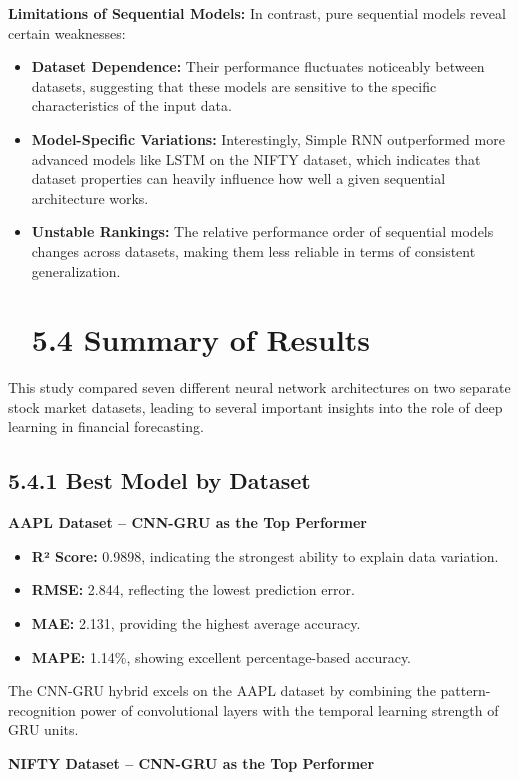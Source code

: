 \documentclass[12pt,a4paper]{report}
\begin{document}
\textbf{Limitations of Sequential Models: }In contrast, pure sequential models reveal certain weaknesses:

\begin{itemize}
  \item \textbf{Dataset Dependence:} Their performance fluctuates noticeably between datasets, suggesting that these models are sensitive to the specific characteristics of the input data.
  \item \textbf{Model-Specific Variations:} Interestingly, Simple RNN outperformed more advanced models like LSTM on the NIFTY dataset, which indicates that dataset properties can heavily influence how well a given sequential architecture works.
  \item \textbf{Unstable Rankings:} The relative performance order of sequential models changes across datasets, making them less reliable in terms of consistent generalization.
\section{5.4 Summary of Results}
\end{itemize}

This study compared seven different neural network architectures on two separate stock market datasets, leading to several important insights into the role of deep learning in financial forecasting.

\subsection{5.4.1 Best Model by Dataset}
\textbf{AAPL Dataset – CNN-GRU as the Top Performer}

\begin{itemize}
  \item \textbf{R² Score:} 0.9898, indicating the strongest ability to explain data variation.
  \item \textbf{RMSE:} 2.844, reflecting the lowest prediction error.
  \item \textbf{MAE:} 2.131, providing the highest average accuracy.
  \item \textbf{MAPE:} 1.14\%, showing excellent percentage-based accuracy.
\end{itemize}

The CNN-GRU hybrid excels on the AAPL dataset by combining the pattern-recognition power of convolutional layers with the temporal learning strength of GRU units.

\textbf{NIFTY Dataset – CNN-GRU as the Top Performer}
\end{document}

